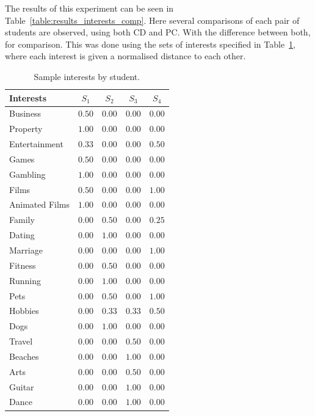 The results of this experiment can be seen in Table~\ref{table:results_interests_comp}. Here several comparisons of each pair of students are observed, using both CD and PC. With the difference between both, for comparison. This was done using the sets of interests specified in Table~\ref{table:sample_interests}, %
where each interest is given a normalised distance to each other.

\begin{table}[H]
\centering
\begin{tabular}{lcccc}
\hline
Interests & $S_1$      & $S_2$      & $S_3$      & $S_4$      \\ \hline
Business       & $0.50$ & $0.00$ & $0.00$ & $0.00$       \\
Property       & $1.00$ & $0.00$ & $0.00$ & $0.00$       \\
Entertainment  & $0.33$ & $0.00$ & $0.00$ & $0.50$       \\
Games          & $0.50$ & $0.00$ & $0.00$ & $0.00$       \\
Gambling       & $1.00$ & $0.00$ & $0.00$ & $0.00$       \\
Films          & $0.50$ & $0.00$ & $0.00$ & $1.00$       \\
Animated Films & $1.00$ & $0.00$ & $0.00$ & $0.00$       \\
Family         & $0.00$ & $0.50$ & $0.00$ & $0.25$       \\
Dating         & $0.00$ & $1.00$ & $0.00$ & $0.00$       \\
Marriage       & $0.00$ & $0.00$ & $0.00$ & $1.00$       \\
Fitness        & $0.00$ & $0.50$ & $0.00$ & $0.00$       \\
Running        & $0.00$ & $1.00$ & $0.00$ & $0.00$       \\
Pets           & $0.00$ & $0.50$ & $0.00$ & $1.00$       \\
Hobbies        & $0.00$ & $0.33$ & $0.33$ & $0.50$       \\
Dogs           & $0.00$ & $1.00$ & $0.00$ & $0.00$       \\
Travel         & $0.00$ & $0.00$ & $0.50$ & $0.00$       \\
Beaches        & $0.00$ & $0.00$ & $1.00$ & $0.00$       \\
Arts           & $0.00$ & $0.00$ & $0.50$ & $0.00$       \\
Guitar         & $0.00$ & $0.00$ & $1.00$ & $0.00$       \\
Dance          & $0.00$ & $0.00$ & $1.00$ & $0.00$       \\ \hline
    \end{tabular}
    \caption{Sample interests by student.}
    \label{table:sample_interests}
\end{table}

